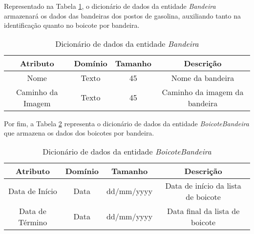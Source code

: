 Representado na Tabela \ref{dic:flag}, o dicionário de dados da entidade \textit{Bandeira} armazenará os dados das bandeiras dos postos de gasolina, auxiliando tanto na identificação quanto no boicote por bandeira.

\begin{table}[H]
\centering
\caption{Dicionário de dados da entidade \textit{Bandeira}}
\label{dic:flag}
\begin{tabular}{|c|c|c|c|}\hline
\textbf{Atributo} & \textbf{Domínio} & \textbf{Tamanho} & \textbf{Descrição}   \\ \hline
Nome                      & Texto                           & 45                & Nome da bandeira \\ \hline
Caminho da Imagem                       & Texto                           & 45                & Caminho da imagem da bandeira\\ \hline

\end{tabular}
\end{table}

Por fim, a Tabela \ref{dic:flag_boycott} representa o dicionário de dados da entidade \textit{BoicoteBandeira} que armazena os dados dos boicotes por bandeira.

\begin{table}[H]
\centering
\caption{Dicionário de dados da entidade \textit{BoicoteBandeira}}
\label{dic:flag_boycott}
\begin{tabular}{|c|c|c|c|}\hline
\textbf{Atributo} & \textbf{Domínio} & \textbf{Tamanho} & \textbf{Descrição}   \\ \hline
Data de Início                      & Data                           & dd/mm/yyyy                & Data de início da lista de boicote \\ \hline
Data de Término                       & Data                           & dd/mm/yyyy                & Data final da lista de boicote\\ \hline

\end{tabular}
\end{table}